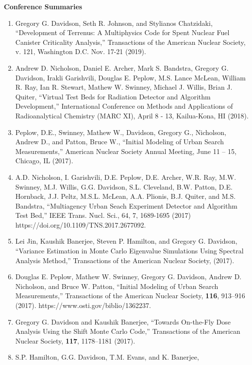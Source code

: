 \documentclass[letterpaper,11pt]{article}
\newcommand{\leftsubheading}[1]{
  \textbf{#1\vspace{-6pt} \\}}
\begin{document}

\leftsubheading{Conference Summaries}
\begin{enumerate}
  \item Gregory G. Davidson, Seth R. Johnson, and Stylianos
    Chatzidaki, ``Development of Terrenus: A Multiphysics Code for
    Spent Nuclear Fuel Canister Criticality Analysis,'' Transactions
    of the American Nuclear Society, v. 121, Washington
    D.C. Nov. 17-21 (2019).
  \item Andrew D. Nicholson, Daniel E. Archer, Mark S. Bandstra,
    Gregory G. Davidson, Irakli Garishvili, Douglas E. Peplow,
    M.S. Lance McLean, William R. Ray, Ian R. Stewart, Mathew
    W. Swinney, Michael J. Willis, Brian J. Quiter, ``Virtual Test
    Beds for Radiation Detector and Algorithm Development,''
    International Conference on Methods and Applications of
    Radioanalytical Chemistry (MARC XI), April 8 - 13, Kailua-Kona,
    HI (2018).
  \item Peplow, D.E., Swinney, Mathew W., Davidson, Gregory G.,
    Nicholson, Andrew D., and Patton, Bruce W., ``Initial Modeling of
    Urban Search Measurements,'' American Nuclear Society Annual
    Meeting, June 11 – 15, Chicago, IL (2017).
  \item A.D. Nicholson, I. Garishvili, D.E. Peplow, D.E. Archer,
    W.R. Ray, M.W. Swinney, M.J. Willis, G.G. Davidson,
    S.L. Cleveland, B.W. Patton, D.E. Hornback, J.J. Peltz,
    M.S.L. McLean, A.A. Plionis, B.J. Quiter, and M.S. Bandstra,
    ``Multiagency Urban Seach Experiment Detector and Algorithm Test
    Bed,'' IEEE Trans. Nucl. Sci., 64, 7, 1689-1695 (2017)
    https://doi.org/10.1109/TNS.2017.2677092.
  \item Lei Jin, Kaushik Banerjee, Steven P. Hamilton, and Gregory
    G. Davidson, ``Variance Estimation in Monte Carlo Eigenvalue
    Simulations Using Spectral Analysis Method,'' Transactions of
    the American Nuclear Society, (2017).
  \item Douglas E. Peplow, Mathew W. Swinney, Gregory G. Davidson,
    Andrew D. Nicholson, and Bruce W. Patton, ``Initial Modeling of
    Urban Search Measurements,'' Transactions of the American Nuclear
    Society, \textbf{116}, 913--916 (2017).
    https://www.osti.gov/biblio/1362237.
  \item Gregory G. Davidson and Kaushik Banerjee, ``Towards On-the-Fly
    Dose Analysis Using the Shift Monte Carlo Code,'' Transactions of
    the American Nuclear Society, \textbf{117}, 1178--1181 (2017).
  \item S.P. Hamilton, G.G. Davidson, T.M. Evans, and K. Banerjee,

\end{enumerate}
\end{document}

